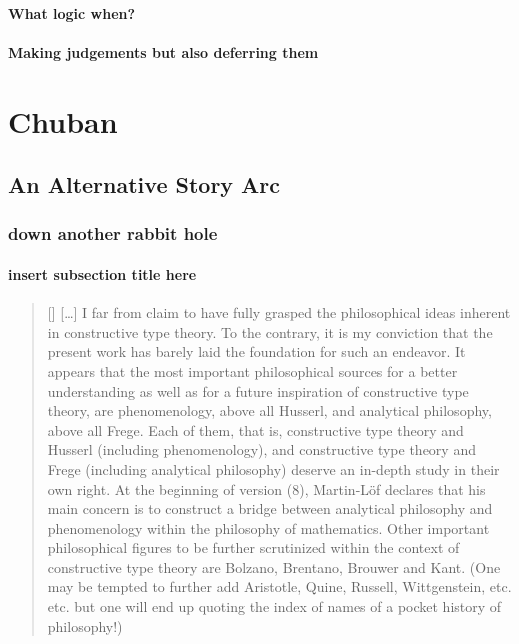 \documentclass[dah,phd,a4paper]{xe_uccthesis}
\begin{document}
\subsection{What logic when?}

\lipsum[82]

\subsection{Making judgements but also deferring them}

\lipsum[83]

\part*{Chuban}


\chapter{An Alternative Story Arc}

\section{down another rabbit hole}

\subsection{insert subsection title here}

\begin{quotation}[]
[…] I far from claim to have fully grasped the philosophical ideas inherent in constructive type theory. To the contrary, it is my conviction that the present work has barely laid the foundation for such an endeavor. It appears that the most important philosophical sources for a better understanding as well as for a future inspiration of constructive type theory, are phenomenology, above all Husserl, and analytical philosophy, above all Frege. Each of them, that is, constructive type theory and Husserl (including phenomenology), and constructive type theory and Frege (including analytical philosophy) deserve an in-depth study in their own right. At the beginning of version (8), Martin-Löf declares that his main concern is to construct a bridge between analytical philosophy and phenomenology within the philosophy of mathematics. Other important philosophical figures to be further scrutinized within the context of constructive type theory are Bolzano, Brentano, Brouwer and Kant. (One may be tempted to further add Aristotle, Quine, Russell, Wittgenstein, etc. etc. but one will end up quoting the index of names of a pocket history of philosophy!)\\
\begin{flushright}
\citep[p. 347]{sommaruga_history_2000-1}
\end{flushright}
\end{quotation}
\end{document}
